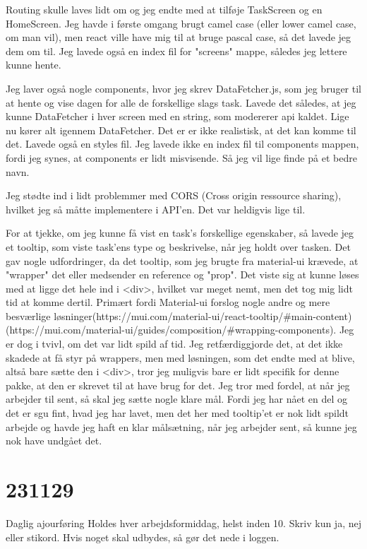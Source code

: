 \documentclass{report}
\begin{document}
Routing skulle laves lidt om og jeg endte med at tilføje TaskScreen og en HomeScreen.
Jeg havde i første omgang brugt camel case (eller lower camel case, om man vil), men react ville have mig til at bruge pascal case, så det lavede jeg dem om til.
Jeg lavede også en index fil for "screens" mappe, således jeg lettere kunne hente.
 
Jeg laver også nogle components, hvor jeg skrev DataFetcher.js, som jeg bruger til at hente og vise dagen for alle de forskellige slags task. Lavede det således, at jeg kunne DataFetcher i hver screen med en string, som modererer api kaldet. Lige nu kører alt igennem DataFetcher. Det er er ikke realistisk, at det kan komme til det.
Lavede også en styles fil. Jeg lavede ikke en index fil til components mappen, fordi jeg synes, at components er lidt misvisende. Så jeg vil lige finde på et bedre navn.
 
Jeg stødte ind i lidt problemmer med CORS (Cross origin ressource sharing), hvilket jeg så måtte implementere i API'en. Det var heldigvis lige til.
 
For at tjekke, om jeg kunne få vist en task’s forskellige egenskaber, så lavede jeg et tooltip, som viste task'ens type og beskrivelse, når jeg holdt over tasken.
Det gav nogle udfordringer, da det tooltip, som jeg brugte fra material-ui krævede, at "wrapper" det eller medsender en reference og "prop". Det viste sig at kunne løses med at ligge det hele ind i <div>, hvilket var meget nemt, men det tog mig lidt tid at komme dertil. Primært fordi Material-ui forslog nogle andre og mere besværlige løsninger(https://mui.com/material-ui/react-tooltip/\#main-content)(https://mui.com/material-ui/guides/composition/\#wrapping-components).
Jeg er dog i tvivl, om det var lidt spild af tid. Jeg retfærdiggjorde det, at det ikke skadede at få styr på wrappers, men med løsningen, som det endte med at blive, altså bare sætte den i <div>, tror jeg muligvis bare er lidt specifik for denne pakke, at den er skrevet til at have brug for det.
Jeg tror med fordel, at når jeg arbejder til sent, så skal jeg sætte nogle klare mål. Fordi jeg har nået en del og det er sgu fint, hvad jeg har lavet, men det her med tooltip'et er nok lidt spildt arbejde og havde jeg haft en klar målsætning, når jeg arbejder sent, så kunne jeg nok have undgået det.

\section{231129}
Daglig ajourføring
Holdes hver arbejdsformiddag, helst inden 10. Skriv kun ja, nej eller stikord. Hvis noget skal udbydes, så gør det nede i loggen.
 
\end{document}
